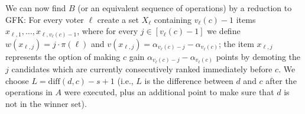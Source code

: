 \documentclass[letterpaper]{article} %
\newcommand{\CIK}{\textsc{GFK}}
\newcommand{\abs}[1]{\lvert{#1}\rvert}
\newcommand{\diff}{\mathrm{diff}}
\begin{document}

We can now find $B$ (or an equivalent sequence of operations) by a reduction to \CIK{}: 
For every voter $\ell$ create a set $X_\ell$ containing $v_\ell(c)-1$ items $x_{\ell,1},\ldots,x_{\ell,v_\ell(c) - 1}$, where for every $j \in [v_\ell(c) - 1]$ we define $w(x_{\ell, j}) = j \cdot \pi(\ell)$ and $v(x_{\ell, j}) = \alpha_{v_\ell(c) - j} - \alpha_{v_\ell(c)}$; the item $x_{\ell, j}$ represents the option of making $c$ gain $\alpha_{v_\ell(c) - j} - \alpha_{v_\ell(c)}$ points by demoting the $j$ candidates which are currently consecutively ranked immediately before $c$. We choose $L = \diff(d, c) - s + 1$ (i.e., $L$ is the difference between $d$ and $c$ after  the operations in $A$ were executed, plus an additional point to make sure that $d$ is not in the winner set).
\end{document}
